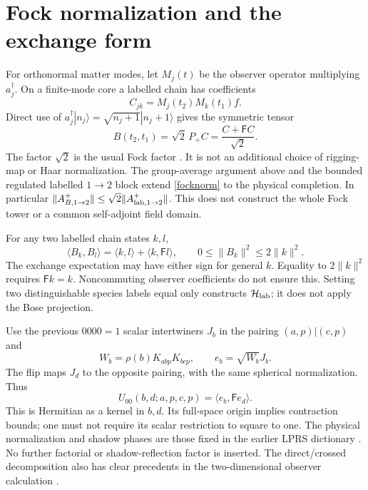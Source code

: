 \documentclass[11pt,a4paper]{article}
\newcommand{\HH}{\mathcal H}
\newcommand{\PP}{P_+}
\newcommand{\FF}{\mathsf F}
\begin{document}
\section{Fock normalization and the exchange form}
For orthonormal matter modes, let $M_j(t)$ be the observer operator
multiplying $a_j^\dagger$. On a finite-mode core a labelled chain has
coefficients
\[
 C_{jk}=M_j(t_2)M_k(t_1)f .
\]
Direct use of
$a_j^\dagger|n_j\rangle=\sqrt{n_j+1}|n_j+1\rangle$
gives the symmetric tensor
\begin{equation}
 B(t_2,t_1)=\sqrt2\,\PP C
           =\frac{C+\FF C}{\sqrt2}.
 \label{focknorm}
\end{equation}
The factor $\sqrt2$ is the usual Fock factor \cite{dg}.
It is not an additional choice of rigging-map or Haar normalization.
The group-average argument above and the bounded regulated labelled
$1\to2$ block extend \eqref{focknorm} to the physical completion. In particular
$\|A^+_{B,1\to2}\|\le\sqrt2\|A^+_{{\rm lab},1\to2}\|$.
This does not construct the whole Fock tower or a common self-adjoint
field domain.

For any two labelled chain states $k,l$,
\begin{equation}
 \langle B_k,B_l\rangle
 =\langle k,l\rangle+\langle k,\FF l\rangle,\qquad
 0\le\|B_k\|^2\le2\|k\|^2 .
 \label{boseform}
\end{equation}
The exchange expectation may have either sign for general $k$.
Equality to $2\|k\|^2$ requires $\FF k=k$.
Noncommuting observer coefficients do not ensure this.
Setting two distinguishable species labels equal only constructs
$\HH_{\rm lab}$; it does not apply the Bose projection.

Use the previous $0000=1$ scalar intertwiners $J_b$ in the pairing
$(a,p)|(c,p)$ and
\[
 W_b=\rho(b)K_{abp}K_{bcp},\qquad e_b=\sqrt{W_b}J_b .
\]
The flip maps $J_d$ to the opposite pairing, with the same spherical
normalization. Thus
\[
 U_{00}(b,d;a,p,c,p)=\langle e_b,\FF e_d\rangle .
\]
This is Hermitian as a kernel in $b,d$. Its full-space origin implies
contraction bounds; one must not require its scalar restriction to
square to one. The physical normalization and shadow phases are those
fixed in the earlier LPRS dictionary \cite{lprs}.
No further factorial or shadow-reflection factor is inserted.
The direct/crossed decomposition also has clear precedents in the
two-dimensional observer calculation \cite{kl}.
\end{document}
